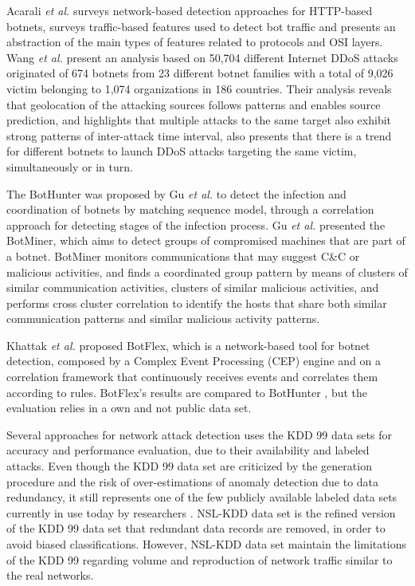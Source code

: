 \documentclass[review]{elsarticle}
\begin{document}
Acarali \emph{et al.} \cite{acarali2016survey} surveys network-based detection approaches for HTTP-based botnets, surveys traffic-based features used to detect bot traffic and presents an abstraction of the main types of features related to protocols and OSI layers. Wang \emph{et al.} \cite{Wang2018ddosbotnetssurvey} present an analysis based on 50,704 different Internet DDoS attacks originated of 674 botnets from 23 different botnet families with a total of 9,026 victim belonging to 1,074 organizations in 186 countries. Their analysis reveals that geolocation of the attacking sources follows patterns and enables source prediction, and highlights that multiple attacks to the same target also exhibit strong patterns of inter-attack time interval, also presents that there is a trend for different botnets to launch DDoS attacks targeting the same victim, simultaneously or in turn.

The BotHunter was proposed by Gu \emph{et al.} \cite{gu2007bothunter} to detect the infection and coordination of botnets by matching sequence model, through a correlation approach for detecting stages of the infection process.  Gu \emph{et al.} \cite{gu2008botminer} presented the BotMiner, which aims to detect groups of compromised machines that are part of a botnet. BotMiner monitors communications that may suggest C\&C or malicious activities, and finds a coordinated group pattern by means of clusters of similar communication activities, clusters of similar malicious activities, and performs cross cluster correlation to identify the hosts that share both similar communication patterns and similar malicious activity patterns.

Khattak \emph{et al.} \cite{khattak2015botflex} proposed BotFlex, which is a network-based tool for botnet detection, composed by a Complex Event Processing (CEP) engine and on a correlation framework that continuously receives events and correlates them according to rules. BotFlex's results are compared to BotHunter \cite{gu2007bothunter}, but the evaluation relies in a own and not public data set.

Several approaches for network attack detection uses the KDD 99 \cite{ahmed2016survey,osanaiye2016distributed,bhuyan2014network} data sets for accuracy and performance evaluation, due to their availability and labeled attacks. Even though the KDD 99 data set are criticized by the generation procedure and the risk of over-estimations of anomaly detection due to data redundancy, it still represents one of the few publicly available labeled data sets currently in use today by researchers \cite{osanaiye2016distributed,bhuyan2014network}. NSL-KDD \cite{tavallaee2009detailed} data set is the refined version of the KDD 99 data set that redundant data records are removed, in order to avoid biased classifications. However, NSL-KDD data set maintain the limitations of the KDD 99 regarding volume and reproduction of network traffic similar to the real networks.
\end{document}

